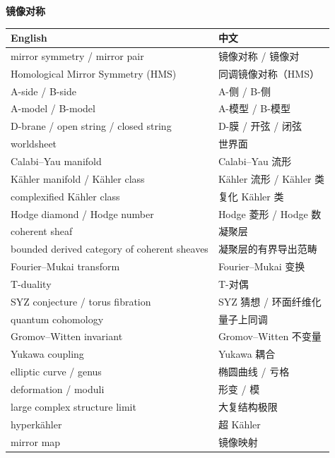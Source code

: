 \vspace{0.6em}
\noindent\textbf{镜像对称}\par\nobreak
\vspace{0.3em}
{\small
\begin{longtable}{p{}p{}}
\toprule
English & 中文 \\
\midrule
\endhead
mirror symmetry / mirror pair & 镜像对称 / 镜像对 \\
Homological Mirror Symmetry (HMS) & 同调镜像对称（HMS） \\
A-side / B-side & A-侧 / B-侧 \\
A-model / B-model & A-模型 / B-模型 \\
D-brane / open string / closed string & D-膜 / 开弦 / 闭弦 \\
worldsheet & 世界面 \\
Calabi–Yau manifold & Calabi–Yau 流形 \\
Kähler manifold / Kähler class & Kähler 流形 / Kähler 类 \\
complexified Kähler class & 复化 Kähler 类 \\
Hodge diamond / Hodge number & Hodge 菱形 / Hodge 数 \\
coherent sheaf & 凝聚层 \\
bounded derived category of coherent sheaves & 凝聚层的有界导出范畴 \\
Fourier–Mukai transform & Fourier–Mukai 变换 \\
T-duality & T-对偶 \\
SYZ conjecture / torus fibration & SYZ 猜想 / 环面纤维化 \\
quantum cohomology & 量子上同调 \\
Gromov–Witten invariant & Gromov–Witten 不变量 \\
Yukawa coupling & Yukawa 耦合 \\
elliptic curve / genus & 椭圆曲线 / 亏格 \\
deformation / moduli & 形变 / 模 \\
large complex structure limit & 大复结构极限 \\
hyperkähler & 超 Kähler \\
mirror map & 镜像映射 \\
\bottomrule
\end{longtable}}

